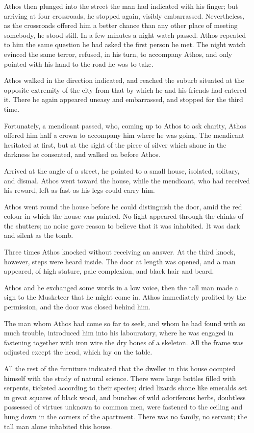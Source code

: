 Athos then plunged into the street the man had indicated with his finger; but arriving at four crossroads, he stopped again, visibly embarrassed. Nevertheless, as the crossroads offered him a better chance than any other place of meeting somebody, he stood still. In a few minutes a night watch passed. Athos repeated to him the same question he had asked the first person he met. The night watch evinced the same terror, refused, in his turn, to accompany Athos, and only pointed with his hand to the road he was to take. 

Athos walked in the direction indicated, and reached the suburb situated at the opposite extremity of the city from that by which he and his friends had entered it. There he again appeared uneasy and embarrassed, and stopped for the third time. 

Fortunately, a mendicant passed, who, coming up to Athos to ask charity, Athos offered him half a crown to accompany him where he was going. The mendicant hesitated at first, but at the sight of the piece of silver which shone in the darkness he consented, and walked on before Athos. 

Arrived at the angle of a street, he pointed to a small house, isolated, solitary, and dismal. Athos went toward the house, while the mendicant, who had received his reward, left as fast as his legs could carry him. 

Athos went round the house before he could distinguish the door, amid the red colour in which the house was painted. No light appeared through the chinks of the shutters; no noise gave reason to believe that it was inhabited. It was dark and silent as the tomb. 

Three times Athos knocked without receiving an answer. At the third knock, however, steps were heard inside. The door at length was opened, and a man appeared, of high stature, pale complexion, and black hair and beard. 

Athos and he exchanged some words in a low voice, then the tall man made a sign to the Musketeer that he might come in. Athos immediately profited by the permission, and the door was closed behind him. 

The man whom Athos had come so far to seek, and whom he had found with so much trouble, introduced him into his labouratory, where he was engaged in fastening together with iron wire the dry bones of a skeleton. All the frame was adjusted except the head, which lay on the table. 

All the rest of the furniture indicated that the dweller in this house occupied himself with the study of natural science. There were large bottles filled with serpents, ticketed according to their species; dried lizards shone like emeralds set in great squares of black wood, and bunches of wild odoriferous herbs, doubtless possessed of virtues unknown to common men, were fastened to the ceiling and hung down in the corners of the apartment. There was no family, no servant; the tall man alone inhabited this house. 

